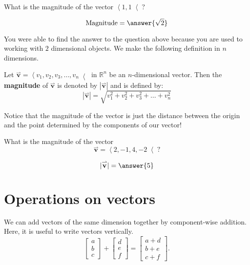 \documentclass{ximera}
\begin{document}
\begin{question}
  What is the magnitude of the vector $\left\langle 1,1 \right\langle$?
  \begin{prompt}
    \[
    \text{Magnitude}  = \answer{\sqrt{2}}
    \]
  \end{prompt}
\end{question}

You were able to find the answer to the question above because you are
used to working with $2$ dimensional objects.  We make the following
definition in $n$ dimensions.

\begin{definition}
	Let $\overset{\rightharpoonup}{\mathbf{v}} = \left\langle v_1, v_2, v_3, \dots, v_n \right\langle$ in $\mathbb{R}^n$
        be an $n$-dimensional vector.  Then the \textbf{magnitude} of
        $\overset{\rightharpoonup}{\mathbf{v}}$ is denoted by $|\overset{\rightharpoonup}{\mathbf{v}}|$ and is defined by:
	\[
	|\overset{\rightharpoonup}{\mathbf{v}}| = \sqrt{v_1^2+v_2^2+v_3^2+\dots+v_n^2}
	\]
\end{definition}

Notice that the magnitude of the vector is just the distance between 
the origin and the point determined by the components of our vector!

\begin{question}
  What is the magnitude of the vector
  \[
  \overset{\rightharpoonup}{\mathbf{v}}=\left\langle 2,-1,4,-2 \right\langle?
  \]
  \begin{prompt}
    \[
    |\overset{\rightharpoonup}{\mathbf{v}}|=\answer{5}
    \]
  \end{prompt}
\end{question}




\section{Operations on vectors}


We can add vectors of the same dimension together by component-wise
addition. Here, it is useful to write vectors vertically.
\[
\begin{bmatrix}
  a\\
  b\\
  c
\end{bmatrix}
+
\begin{bmatrix}
  d\\
  e\\
  f
\end{bmatrix}
=
\begin{bmatrix}
  a+d\\
  b+e\\
  c+f
\end{bmatrix}.
\]
\end{document}
